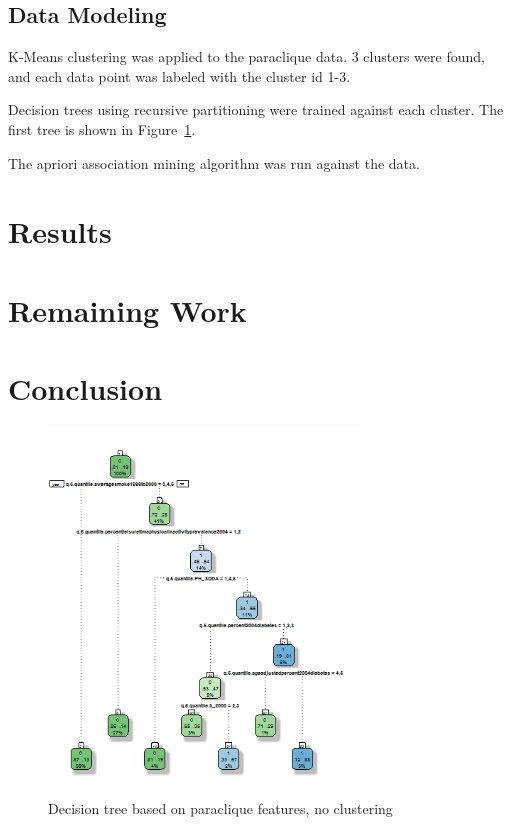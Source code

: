 \documentclass[conference,compsoc]{IEEEtran}
\begin{document}
\subsection{Data Modeling}

K-Means clustering was applied to the paraclique data. 3 clusters were found, and each data point was labeled with the cluster id 1-3.

Decision trees using recursive partitioning were trained against each cluster. The first tree is shown in Figure~\ref{decision.tree.01}.

The apriori association mining algorithm was run against the data.

\section{Results}

\section{Remaining Work}

\section{Conclusion}

\begin{figure}[!t]
\centering
\includegraphics[width=3.25in]{decision-tree-01-paraclique-no-clustering.png}
\caption{Decision tree based on paraclique features, no clustering}
\label{decision.tree.01}
\end{figure}
\end{document}
